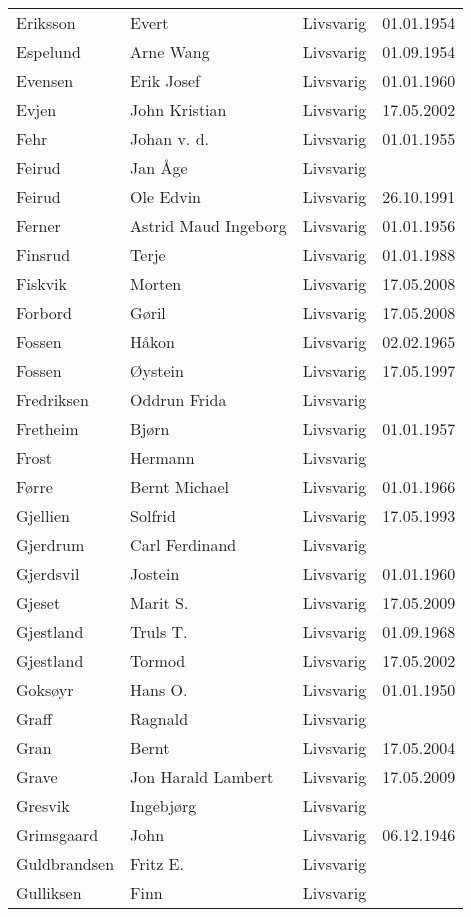 \begin{longtable}{llll}
Eriksson	&	Evert	&	Livsvarig 	&	01.01.1954	\\
Espelund	&	Arne Wang	&	Livsvarig 	&	01.09.1954	\\
Evensen	&	Erik Josef	&	Livsvarig 	&	01.01.1960	\\
Evjen 	&	John Kristian	&	Livsvarig	&	17.05.2002	\\
Fehr	&	Johan v. d.	&	Livsvarig 	&	01.01.1955	\\
Feirud  &	Jan Åge		&	Livsvarig	&			\\
Feirud	&	Ole Edvin	&	Livsvarig 	&	26.10.1991	\\
Ferner	&	Astrid Maud Ingeborg	&	Livsvarig 	&	01.01.1956	\\
Finsrud	&	Terje	&	Livsvarig 	&	01.01.1988	\\
Fiskvik	&	Morten	&	Livsvarig	&	17.05.2008	\\
Forbord	&	Gøril	&	Livsvarig	&	17.05.2008	\\
Fossen	&	Håkon	&	Livsvarig 	&	02.02.1965	\\
Fossen 	&	Øystein	&	Livsvarig	&	17.05.1997	\\
Fredriksen &	Oddrun Frida &	Livsvarig	&			\\
Fretheim	&	Bjørn	&	Livsvarig 	&	01.01.1957	\\
Frost	&	Hermann	&	Livsvarig 	&		\\
Førre	&	Bernt Michael	&	Livsvarig 	&	01.01.1966	\\
Gjellien	&	Solfrid	&	Livsvarig 	&	17.05.1993	\\
Gjerdrum	&	Carl Ferdinand	&	Livsvarig 	&		\\
Gjerdsvil	&	Jostein	&	Livsvarig 	&	01.01.1960	\\
Gjeset	&	Marit S.	&	Livsvarig	&	17.05.2009	\\
Gjestland	&	Truls T. 	&	Livsvarig 	&	01.09.1968	\\
Gjestland 	&	Tormod	&	Livsvarig	&	17.05.2002	\\
Goksøyr	&	Hans O.	&	Livsvarig 	&	01.01.1950	\\
Graff	&	Ragnald	&	Livsvarig 	&		\\
Gran 	&	Bernt	&	Livsvarig	&	17.05.2004	\\
Grave	&	Jon Harald Lambert	&	Livsvarig	&	17.05.2009	\\
Gresvik	&	Ingebjørg	&	Livsvarig 	&		\\
Grimsgaard	&	John	&	Livsvarig 	&	06.12.1946	\\
Guldbrandsen	&	Fritz E. 	&	Livsvarig 	&		\\
Gulliksen	&	Finn	&	Livsvarig 	&		\\

\end{longtable}
